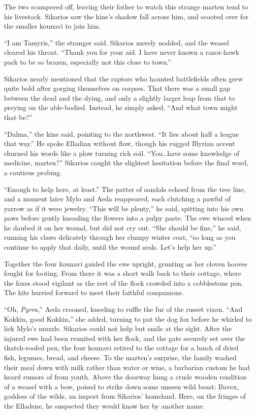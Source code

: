 The two scampered off, leaving their father to watch this strange marten tend to his livestock. Sikarios saw the kine's shadow fall across him, and scooted over for the smaller kounavi to join him.

``I am Tamyris,'' the stranger said. Sikarios merely nodded, and the weasel cleared his throat. ``Thank you for your aid. I have never known a razor-hawk pack to be so brazen, especially not this close to town.''

Sikarios nearly mentioned that the raptors who haunted battlefields often grew quite bold after gorging themselves on corpses. That there was a small gap between the dead and the dying, and only a slightly larger leap from that to preying on the able-bodied. Instead, he simply asked, ``And what town might that be?''

``Dalma,'' the kine said, pointing to the northwest. ``It lies about half a league that way.'' He spoke Elladian without flaw, though his rugged Illyrian accent churned his words like a plow turning rich soil. ``You\ldots{}have some knowledge of medicine, marten?'' Sikarios caught the slightest hesitation before the final word, a cautious probing.

``Enough to help here, at least.'' The patter of sandals echoed from the tree line, and a moment later Mylo and Aeda reappeared, each clutching a pawful of yarrow as if it were jewelry. ``This will be plenty,'' he said, spitting into his own paws before gently kneading the flowers into a pulpy paste. The ewe winced when he daubed it on her wound, but did not cry out. ``She should be fine,'' he said, running his claws delicately through her clumpy winter coat, ``so long as you continue to apply that daily, until the wound seals. Let's help her up.''

Together the four kounavi guided the ewe upright, grunting as her cloven hooves fought for footing. From there it was a short walk back to their cottage, where the foxes stood vigilant as the rest of the flock crowded into a cobblestone pen. The kits hurried forward to meet their faithful companions.

``Oh, \emph{Pyrra},'' Aeda crooned, kneeling to ruffle the fur of the russet vixen. ``And Kokkin, good Kokkin,'' she added, turning to pat the dog fox before he whirled to lick Mylo's muzzle. Sikarios could not help but smile at the sight. After the injured ewe had been reunited with her flock, and the gate securely set over the thatch-roofed pen, the four kounavi retired to the cottage for a lunch of dried fish, legumes, bread, and cheese. To the marten's surprise, the family washed their meal down with milk rather than water or wine, a barbarian custom he had heard rumors of from youth. Above the doorway hung a crude wooden rendition of a weasel with a bow, poised to strike down some unseen wild beast: Iluvex, goddess of the wilds, an import from Sikarios' homeland. Here, on the fringes of the Elladene, he suspected they would know her by another name.

